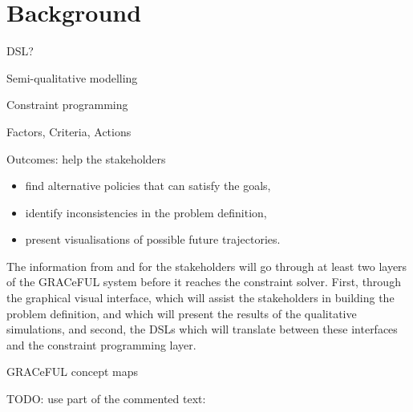 \section{Background}
\label{sec:background}


DSL?

Semi-qualitative modelling

Constraint programming

Factors, Criteria, Actions

Outcomes: help the stakeholders

\begin{itemize}
\item find alternative policies that can satisfy the goals,
\item identify inconsistencies in the problem definition,
\item  present visualisations of possible future trajectories.
\end{itemize}

The information from and for the stakeholders will go through at least
two layers of the GRACeFUL system before it reaches the constraint
solver. First, through the graphical visual interface, which will
assist the stakeholders in building the problem definition, and which
will present the results of the qualitative simulations, and second,
the DSLs which will translate between these interfaces and the
constraint programming layer.

GRACeFUL concept maps

TODO: use part of the commented text:

